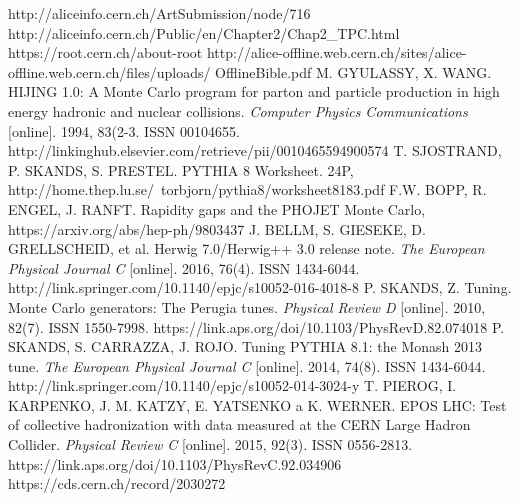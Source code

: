\documentclass[thesismargins, thesislinespacing]{rnthesis}
\begin{document}
\begin{thebibliography}{}
http://aliceinfo.cern.ch/ArtSubmission/node/716
http://aliceinfo.cern.ch/Public/en/Chapter2/Chap2\_TPC.html
https://root.cern.ch/about-root 
http://alice-offline.web.cern.ch/sites/alice-offline.web.cern.ch/files/uploads/ \- OfflineBible.pdf
M. GYULASSY, X. WANG. HIJING 1.0: A Monte Carlo program for parton and particle production in high energy hadronic and nuclear collisions. \textit{Computer Physics Communications} [online]. 1994, 83(2-3. ISSN 00104655. http://linkinghub.elsevier.com/retrieve/pii/0010465594900574
T. SJOSTRAND, P. SKANDS, S. PRESTEL.  PYTHIA 8 Worksheet. 24P, http://home.thep.lu.se/~torbjorn/pythia8/worksheet8183.pdf
F.W. BOPP, R. ENGEL, J. RANFT.  Rapidity gaps and the PHOJET Monte Carlo, https://arxiv.org/abs/hep-ph/9803437
J. BELLM, S. GIESEKE, D. GRELLSCHEID, et al. Herwig 7.0/Herwig++ 3.0 release note. \textit{The European Physical Journal C} [online]. 2016, 76(4). ISSN 1434-6044. http://link.springer.com/10.1140/epjc/s10052-016-4018-8
P. SKANDS, Z. Tuning. Monte Carlo generators: The Perugia tunes. \textit{Physical Review D }[online]. 2010, 82(7). ISSN 1550-7998. https://link.aps.org/doi/10.1103/PhysRevD.82.074018
P. SKANDS, S. CARRAZZA, J. ROJO. Tuning PYTHIA 8.1: the Monash 2013 tune. \textit{The European Physical Journal C} [online]. 2014, 74(8). ISSN 1434-6044. http://link.springer.com/10.1140/epjc/s10052-014-3024-y
T. PIEROG, I. KARPENKO, J. M. KATZY, E. YATSENKO a K. WERNER. EPOS LHC: Test of collective hadronization with data measured at the CERN Large Hadron Collider. \textit{Physical Review C} [online]. 2015, 92(3). ISSN 0556-2813.
 https://link.aps.org/doi/10.1103/PhysRevC.92.034906
 https://cds.cern.ch/record/2030272
\end{thebibliography}
%
\end{document}
